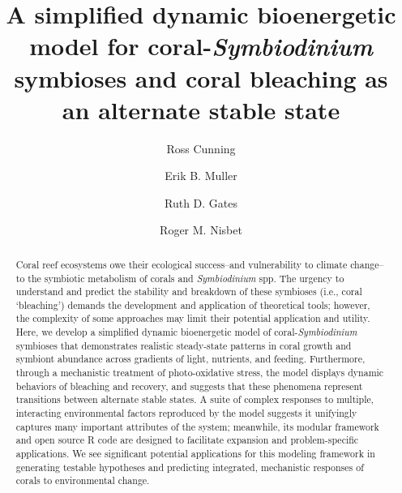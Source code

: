 \documentclass[]{elsarticle} %
\begin{document}
\begin{frontmatter}

  \title{A simplified dynamic bioenergetic model for coral-\emph{Symbiodinium}
symbioses and coral bleaching as an alternate stable state}
    \author[University of Hawaii]{Ross Cunning}
    \author[University of California]{Erik B. Muller}
  
  
    \author[University of Hawaii]{Ruth D. Gates}
  
  
    \author[University of California]{Roger M. Nisbet}
  
  
      \address[University of Hawaii]{Hawaii Institute of Marine Biology, Kaneohe, HI 96744, USA}
    \address[University of California]{Department of Ecology, Evolution, and Marine Biology, Santa Barbara, CA
93106, USA}
  
  \begin{abstract}
  Coral reef ecosystems owe their ecological success--and vulnerability to
  climate change--to the symbiotic metabolism of corals and
  \emph{Symbiodinium} spp. The urgency to understand and predict the
  stability and breakdown of these symbioses (i.e., coral `bleaching')
  demands the development and application of theoretical tools; however,
  the complexity of some approaches may limit their potential application
  and utility. Here, we develop a simplified dynamic bioenergetic model of
  coral-\emph{Symbiodinium} symbioses that demonstrates realistic
  steady-state patterns in coral growth and symbiont abundance across
  gradients of light, nutrients, and feeding. Furthermore, through a
  mechanistic treatment of photo-oxidative stress, the model displays
  dynamic behaviors of bleaching and recovery, and suggests that these
  phenomena represent transitions between alternate stable states. A suite
  of complex responses to multiple, interacting environmental factors
  reproduced by the model suggests it unifyingly captures many important
  attributes of the system; meanwhile, its modular framework and open
  source R code are designed to facilitate expansion and problem-specific
  applications. We see significant potential applications for this
  modeling framework in generating testable hypotheses and predicting
  integrated, mechanistic responses of corals to environmental change.
  \end{abstract}
  
 \end{frontmatter}
\end{document}
